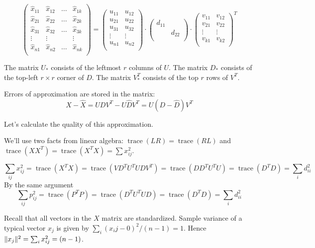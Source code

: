 \documentclass[12pt]{article}
\DeclareMathOperator{\trace}{trace}
\DeclarePairedDelimiter{\norm}{\lVert}{\rVert}
\begin{document}
\[
\begin{pmatrix}
    \hat x_{11} & \hat x_{12} & \dots & \hat x_{1k} \\
    \hat x_{21} & \hat x_{22} & \dots & \hat x_{2k} \\
    \hat x_{31} & \hat x_{32} & \dots & \hat x_{3k} \\
    \vdots & \vdots &    & \vdots \\
    \hat x_{n1} & \hat x_{n2} & \dots & \hat x_{nk} \\
\end{pmatrix} =
\begin{pmatrix}
    u_{11} & u_{12}  \\
    u_{21} & u_{22} \\
    u_{31} & u_{32} \\
    \vdots & \vdots \\
    u_{n1} & u_{n2} \\
\end{pmatrix} \cdot 
\begin{pmatrix}
    d_{11} &  \\
     & d_{22} \\
\end{pmatrix} \cdot
\begin{pmatrix}
    v_{11} & v_{12}  \\
    v_{21} & v_{22} \\
    \vdots & \vdots \\
    v_{k1} & v_{k2} \\
\end{pmatrix}^T
\]

The matrix $U_*$ consists of the leftmost $r$ columns of $U$.
The matrix $D_*$ consists of the top-left $r\times r$ corner of $D$.
The matrix $V_*^T$ consists of the top $r$ rows of $V^T$.


Errors of approximation are stored in the matrix:
\[
X - \hat X = UDV^T - U \hat D V^T = U(D - \hat D) V^T
\]


Let's calculate the quality of this approximation. 

We'll use two facts from linear algebra: $\trace(LR) = \trace(RL)$ and  $\trace(XX^T) = \trace(X^TX) = \sum x_{ij}^2$.

\[
\sum_{ij} x_{ij}^2 = \trace(X^TX) = \trace(VD^T U^TUDV^T ) = \trace(DD^T U^TU)= \trace(D^TD) = \sum_{i} d_{ii}^2
\]
By the same argument
\[
\sum_{ij} p_{ij}^2 = \trace(P^TP) = \trace(D^T U^T UD) =  \trace(D^TD) = \sum_{i} d_{ii}^2
\]

Recall that all vectors in the $X$ matrix are standardized.
Sample variance of a typical vector $x_j$ is given by $\sum_i (x_ij - 0)^2 / (n-1) = 1$.
Hence $\norm{x_j}^2 = \sum_i x_{ij}^2 = (n-1)$.
\end{document}
